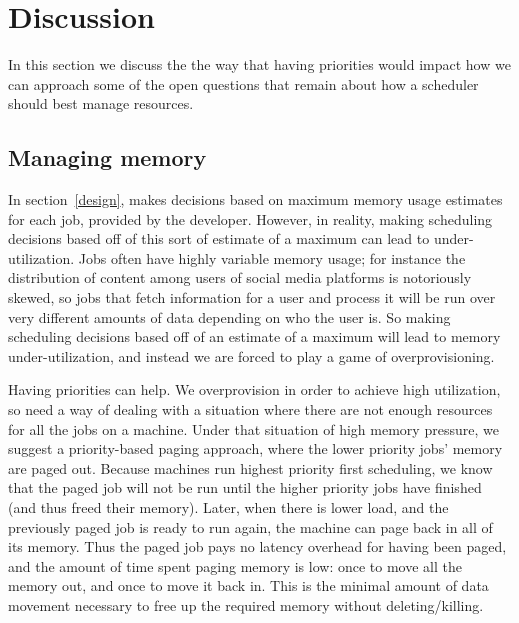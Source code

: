 \section{Discussion}

In this section we discuss the the way that having priorities would impact how
we can approach some of the open questions that remain about how a scheduler
should best manage resources.


\subsection{Managing memory}

In section~\ref{design}, \sys{} makes decisions based on maximum memory usage
estimates for each job, provided by the developer. However, in reality, making
scheduling decisions based off of this sort of estimate of a maximum can lead to
under-utilization. Jobs often have highly variable memory usage; for instance the
distribution of content among users of social media platforms is notoriously
skewed\cite{TODO}, so jobs that fetch information for a user and process it will
be run over very different amounts of data depending on who the user is. So
making scheduling decisions based off of an estimate of a maximum will lead to
memory under-utilization, and instead we are forced to play a game of
overprovisioning.

Having priorities can help. We overprovision in order to achieve high
utilization, so need a way of dealing with a situation where there are not
enough resources for all the jobs on a machine. Under that situation of high
memory pressure, we suggest a priority-based paging approach, where the lower
priority jobs' memory are paged out. Because machines run highest priority first
scheduling, we know that the paged job will not be run until the higher priority
jobs have finished (and thus freed their memory). Later, when there is lower load, and the
previously paged job is ready to run again, the machine can page back in all of
its memory. Thus the paged job pays no latency overhead for having been paged,
and the amount of time spent paging memory is low: once to move all the memory
out, and once to move it back in. This is the minimal amount of data movement
necessary to free up the required memory without deleting/killing.


